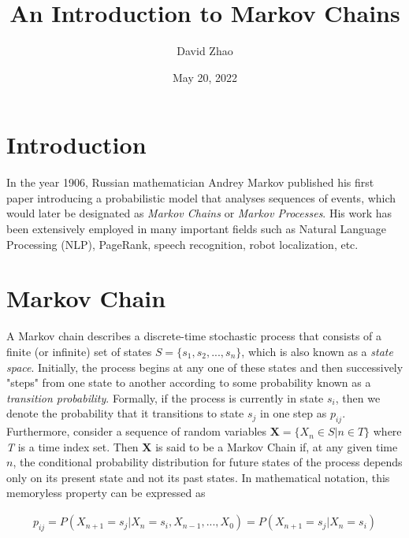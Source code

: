 \documentclass[a4paper, 12pt]{article}
\begin{document}
\title{An Introduction to Markov Chains}
\author{David Zhao}
\date{May 20, 2022}
\maketitle
{}

\section*{Introduction}

In the year 1906, Russian mathematician Andrey Markov published his first paper
introducing a probabilistic model that analyses sequences of events, 
which would later be designated as \emph{Markov Chains} or \emph{Markov Processes}. His work has been extensively employed
in many important fields such as Natural Language Processing (NLP), PageRank, speech recognition, robot localization, etc.

\section*{Markov Chain}

	A Markov chain describes a discrete-time stochastic process that consists of a finite (or infinite) set of states 
	$S = \{s_1, s_2, ..., s_n \}$, which is also known as a \emph{state space}. Initially, the process begins at any 
	one of these states and then successively "steps" from one state to another according to some probability known as 
	a \emph{transition probability}. Formally, if the process is currently in state $s_i$, then we denote the probability 
	that it transitions to state $s_j$ in one step as $p_{ij}$.
	\newline
	Furthermore, consider a sequence of random variables $\mathbf{X} = \{X_n \in S | n \in T\}$ where \emph{T} is a time index 
	set. Then $\mathbf{X}$ is said to be a Markov Chain if, at any given time $n$, the conditional probability distribution for future states
	of the process depends only on its present state and not its past states. In mathematical notation, this memoryless
	property can be expressed as

	\begin{equation*}
		\begin{aligned}
			p_{ij} = P(X_{n+1} = s_j | X_{n} = s_i, X_{n-1}, ... , X_0) = P(X_{n+1} = s_j | X_{n}= s_i)
		\end{aligned}
	\end{equation*}
\end{document}
